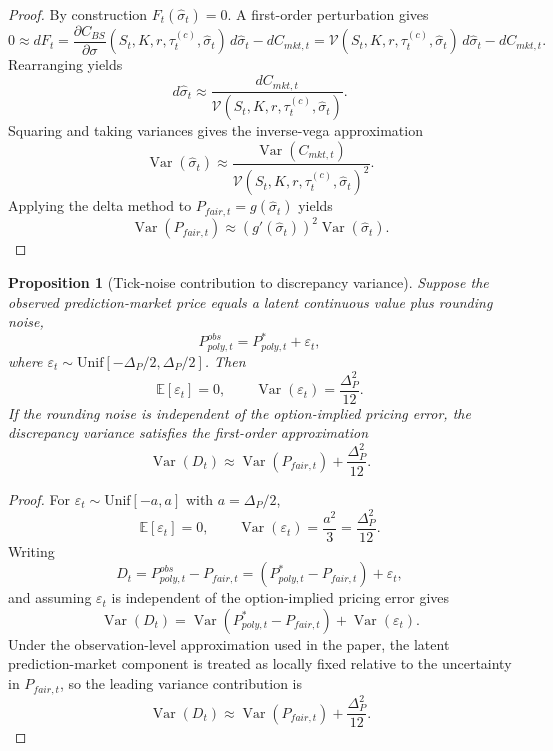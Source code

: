 \documentclass[11pt]{article}
\numberwithin{equation}{section}
\theoremstyle{plain}
\newtheorem{proposition}{Proposition}[section]
\begin{document}
\begin{proof}
By construction $F_t(\hat{\sigma}_t)=0$. A first-order perturbation gives
\[
0\approx dF_t
=
\frac{\partial C_{BS}}{\partial \sigma}(S_t,K,r,\tau_t^{(c)},\hat{\sigma}_t)\,d\hat{\sigma}_t-dC_{mkt,t}
=
\mathcal{V}(S_t,K,r,\tau_t^{(c)},\hat{\sigma}_t)\,d\hat{\sigma}_t-dC_{mkt,t}.
\]
Rearranging yields
\[
d\hat{\sigma}_t\approx \frac{dC_{mkt,t}}{\mathcal{V}(S_t,K,r,\tau_t^{(c)},\hat{\sigma}_t)}.
\]
Squaring and taking variances gives the inverse-vega approximation
\[
\operatorname{Var}(\hat{\sigma}_t)
\approx
\frac{\operatorname{Var}(C_{mkt,t})}
{\mathcal{V}(S_t,K,r,\tau_t^{(c)},\hat{\sigma}_t)^2}.
\]
Applying the delta method to $P_{fair,t}=g(\hat{\sigma}_t)$ yields
\[
\operatorname{Var}(P_{fair,t})
\approx
\left(g'(\hat{\sigma}_t)\right)^2\operatorname{Var}(\hat{\sigma}_t).
\]
\end{proof}

\begin{proposition}[Tick-noise contribution to discrepancy variance]
\label{prop:tick-noise}
Suppose the observed prediction-market price equals a latent continuous value plus rounding noise,
\[
P_{poly,t}^{obs}=P_{poly,t}^{\ast}+\varepsilon_t,
\]
where $\varepsilon_t\sim \mathrm{Unif}[-\Delta_P/2,\Delta_P/2]$. Then
\[
\mathbb{E}[\varepsilon_t]=0,
\qquad
\operatorname{Var}(\varepsilon_t)=\frac{\Delta_P^2}{12}.
\]
If the rounding noise is independent of the option-implied pricing error, the discrepancy variance satisfies the first-order approximation
\[
\operatorname{Var}(D_t)
\approx
\operatorname{Var}(P_{fair,t})+\frac{\Delta_P^2}{12}.
\]
\end{proposition}

\begin{proof}
For $\varepsilon_t\sim \mathrm{Unif}[-a,a]$ with $a=\Delta_P/2$,
\[
\mathbb{E}[\varepsilon_t]=0,
\qquad
\operatorname{Var}(\varepsilon_t)=\frac{a^2}{3}=\frac{\Delta_P^2}{12}.
\]
Writing
\[
D_t=P_{poly,t}^{obs}-P_{fair,t}
=
\left(P_{poly,t}^{\ast}-P_{fair,t}\right)+\varepsilon_t,
\]
and assuming $\varepsilon_t$ is independent of the option-implied pricing error gives
\[
\operatorname{Var}(D_t)
=
\operatorname{Var}(P_{poly,t}^{\ast}-P_{fair,t})+\operatorname{Var}(\varepsilon_t).
\]
Under the observation-level approximation used in the paper, the latent prediction-market component is treated as locally fixed relative to the uncertainty in $P_{fair,t}$, so the leading variance contribution is
\[
\operatorname{Var}(D_t)\approx \operatorname{Var}(P_{fair,t})+\frac{\Delta_P^2}{12}.
\]
\end{proof}



\end{document}
